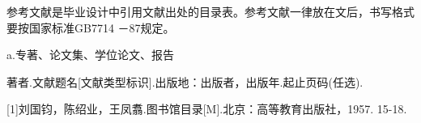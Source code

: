 \thesisreferenceguidance
\begingroup\setlength{\parindent}{0bp}\frenchspacing\heiti\fontsize{10.56bp}{19.5bp}\selectfont
{}
{\color{red}\noindent
{参考文献是毕业设计中引用文献出处的目录表。参考文献一律放在文后，书写格式要按国家标准GB7714\linebreak
－\hspace{0bp}87规定。\par}
a.\hspace{2.64bp}专著、论文集、学位论文、报告\par
[序号]\hspace{5.28bp}著者.\hspace{5.28bp}文献题名\nobreak\hspace{0bp}[文献类型标识].\hspace{5.28bp}出版地：出版者，出版年.\hspace{5.28bp}起止页码\nobreak\hspace{0bp}(任选).\par}
{\color{blue}\noindent
{\color{red}[1]}\hspace{5.28bp}刘国钧，陈绍业，王凤翥.\hspace{5.28bp}图书馆目录\nobreak\hspace{0bp}[M].\hspace{5.28bp}北京：高等教育出版社，1957. 15-18.\par}
